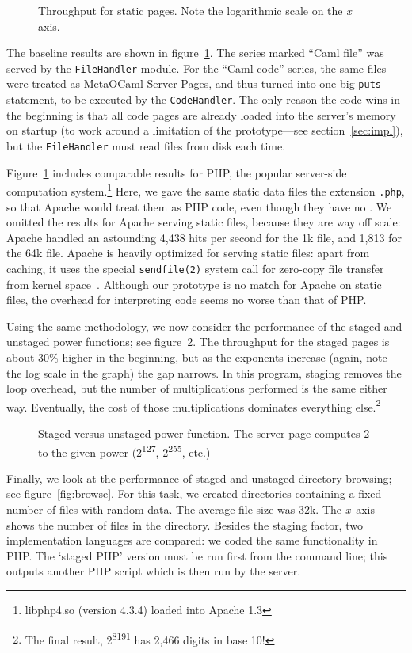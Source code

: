 \documentclass[preprint]{acm_proc_article-sp}
\def\MOC{MetaOCaml\xspace}
\newcommand{\myfig}[3]{%
  \begin{figure}[tbp]%
    #3%
    \caption{#2}%
    \label{fig:#1}%
  \end{figure}}
\newcommand{\gnuplot}[2]{%
  \myfig{#1}{#2}{}}
\begin{document}
\gnuplot{static}{Throughput for static pages.  Note the logarithmic
  scale on the \textit x axis.}

The baseline results are shown in figure~\ref{fig:static}.  The series
marked “Caml file” was served by the \texttt{FileHandler} module.  For
the “Caml code” series, the same files were treated as \MOC Server
Pages, and thus turned into one big \texttt{puts} statement, to be
executed by the \texttt{CodeHandler}.  The only reason the code
wins in the beginning is that all code pages are already loaded into
the server’s memory on startup (to work around a limitation of the
prototype---see section~\ref{sec:impl}), but the \texttt{FileHandler}
must read files from disk each time.

Figure~\ref{fig:static} includes comparable results for PHP, the
popular server-side computation system.\footnote{libphp4.so
  (version 4.3.4) loaded into Apache 1.3} Here, we gave the same
static data files the extension \texttt{.php}, so that Apache
would treat them as PHP code, even though they have no
.
We omitted the results for Apache serving static files, because they
are way off scale: Apache handled an astounding 4,438 hits per second
for the 1k file, and 1,813 for the 64k file.  Apache is heavily
optimized for serving static files: apart from caching, it uses the
special \texttt{sendfile(2)} system call for zero-copy file transfer
from kernel space~\cite{tranter03sendfile}.  Although our prototype is
no match for Apache on static files, the overhead for interpreting
code seems no worse than that of PHP.

Using the same methodology, we now consider the performance of
the staged and unstaged power functions; see
figure~\ref{fig:power}.  The throughput for the staged pages is
about 30\% higher in the beginning, but as the exponents
increase (again, note the log scale in the graph) the gap
narrows.  In this program, staging removes the loop overhead,
but the number of multiplications performed is the same either
way.  Eventually, the cost of those multiplications dominates
everything else.\footnote{The final result,
  2\textsuperscript{8191} has 2,466 digits in base 10!}

\gnuplot{power}{Staged versus unstaged power function.  The
  server page computes 2 to the given power
  (2\textsuperscript{127}, 2\textsuperscript{255}, etc.)}

Finally, we look at the performance of staged and unstaged directory
browsing; see figure~\ref{fig:browse}.  For this task, we created
directories containing a fixed number of files with random data.  The
average file size was 32k.  The \emph{x}~axis shows the number of
files in the directory.  Besides the staging factor, two
implementation languages are compared: we coded the same functionality
in PHP.  The `staged PHP' version must be run first from the command
line; this outputs another PHP script which is then run by the server.
\end{document}
